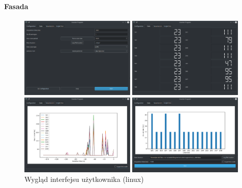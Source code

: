 \documentclass[a4paper,12pt]{article}
\begin{document}
\paragraph{Fasada}
\begin{figure}
        \begin{multicols}{2}
        
        \includegraphics[width=0.49\textwidth]{configuration.png}\par
        
        
        \includegraphics[width=0.49\textwidth]{digits.png}\par
        
        
        \end{multicols}\hfill
        
        \begin{multicols}{2}
        
        
        \includegraphics[width=0.49\textwidth]{wizualization.png}\par
        
        
        \includegraphics[width=0.49\textwidth]{wiz_ss.png}\par
        
        \end{multicols}
        \caption{Wygląd interfejsu użytkownika (linux)}
        \label{Gui pic}
        \end{figure}
\end{document}
